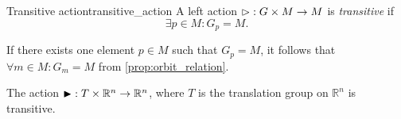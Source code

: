 \begin{definition}{Transitive action}{transitive_action}
    A left action \(\mathbin{\vartriangleright} : G \times M \to M\) is \emph{transitive} if
    \begin{equation*}
        \exists p \in M : G_p = M.
    \end{equation*}
\end{definition}
\begin{remark}
    If there exists one element \(p \in M\) such that \(G_p = M\), it follows that \(\forall m \in M : G_m = M\) from \cref{prop:orbit_relation}.
\end{remark}
\begin{example}
    The action \(\mathbin{\blacktriangleright} : T \times \mathbb{R}^n \to \mathbb{R}^n\), where \(T\) is the translation group on \(\mathbb{R}^n\) is transitive.
\end{example}


